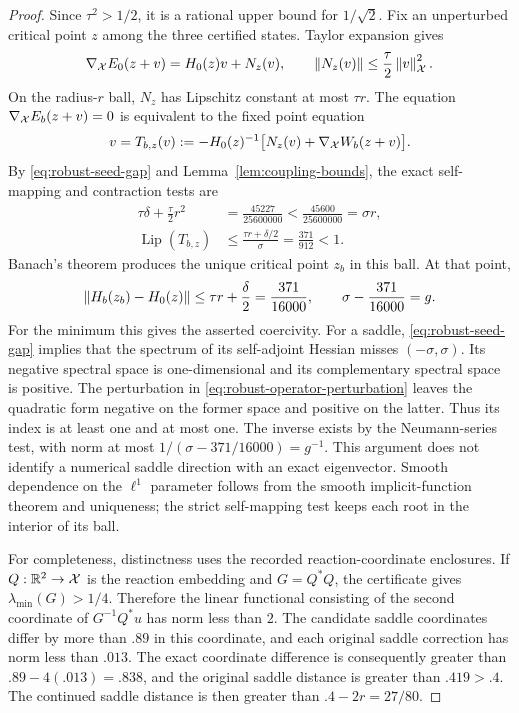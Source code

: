 \begin{proof}
Since $\tau^2>1/2$, it is a rational upper bound for $1/\sqrt2$.
Fix an unperturbed critical point $z$ among the three certified states.
Taylor expansion gives
\[
 \nabla_{\mathcal X}E_0(z+v)=H_0(z)v+N_z(v),\qquad
 \left\lVert N_z(v)\right\rVert\le\frac\tau2\left\lVert v\right\rVert_{\mathcal X}^2.
\]
On the radius-$r$ ball, $N_z$ has Lipschitz constant at most $\tau r$.
The equation $\nabla_{\mathcal X}E_b(z+v)=0$ is equivalent to the fixed point
equation
\[
 v=T_{b,z}(v):=-H_0(z)^{-1}
             \big[N_z(v)+\nabla_{\mathcal X}W_b(z+v)\big].
\]
By \eqref{eq:robust-seed-gap} and
Lemma~\ref{lem:coupling-bounds}, the exact self-mapping and contraction
tests are
\begin{align}
 \tau\delta+\frac\tau2r^2
 &=\frac{45227}{25600000}
 <\frac{45600}{25600000}=\sigma r,
 \label{eq:robust-newton-map}\\
 \operatorname{Lip}(T_{b,z})
 &\le\frac{\tau r+\delta/2}{\sigma}
 =\frac{371}{912}<1.
 \label{eq:robust-newton-contraction}
\end{align}
Banach's theorem produces the unique critical point $z_b$ in this ball.
At that point,
\begin{equation}
 \label{eq:robust-operator-perturbation}
 \left\lVert H_b(z_b)-H_0(z)\right\rVert\le\tau r+\frac\delta2
 =\frac{371}{16000},\qquad
 \sigma-\frac{371}{16000}=g.
\end{equation}
For the minimum this gives the asserted coercivity. For a saddle,
\eqref{eq:robust-seed-gap} implies that the spectrum of its self-adjoint
Hessian misses $(-\sigma,\sigma)$. Its negative spectral space is
one-dimensional and its complementary spectral space is positive.
The perturbation in \eqref{eq:robust-operator-perturbation} leaves the
quadratic form negative on the former space and positive on the latter.
Thus its index is at least one and at most one. The inverse exists by
the Neumann-series test, with norm at most
$1/(\sigma-371/16000)=g^{-1}$. This argument does not identify a
numerical saddle direction with an exact eigenvector. Smooth dependence
on the $\ell^1$ parameter follows from the smooth implicit-function
theorem and uniqueness; the strict self-mapping test keeps each root
in the interior of its ball.

For completeness, distinctness uses the recorded reaction-coordinate
enclosures. If $Q:\mathbb R^2\to\mathcal X$ is the reaction embedding and $G=Q^*Q$,
the certificate gives $\lambda_{\min}(G)>1/4$. Therefore the linear
functional consisting of the second coordinate of $G^{-1}Q^*u$ has
norm less than $2$. The candidate saddle coordinates differ by more
than $.89$ in this coordinate, and each original saddle correction has
norm less than $.013$. The exact coordinate difference is consequently
greater than $.89-4(.013)=.838$, and the original saddle distance is
greater than $.419>.4$. The continued saddle distance is then greater
than $.4-2r=27/80$.


\end{proof}

